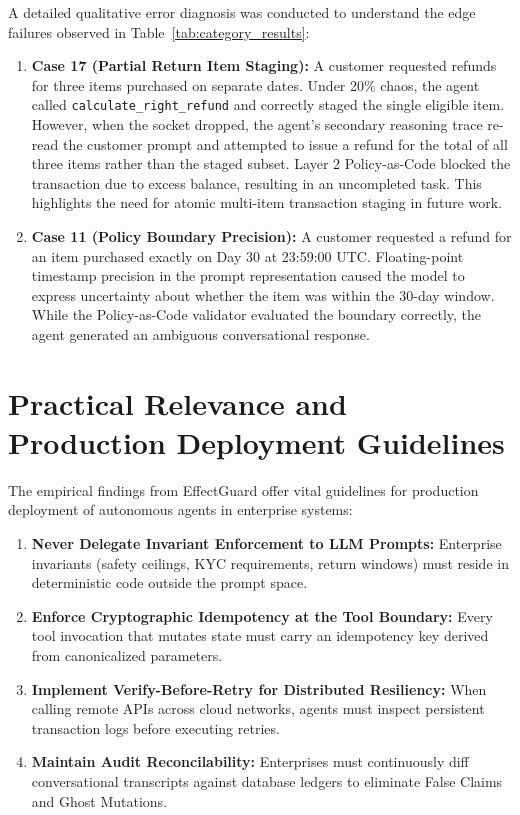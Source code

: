 A detailed qualitative error diagnosis was conducted to understand the edge failures observed in Table~\ref{tab:category_results}:

\begin{enumerate}
    \item \textbf{Case 17 (Partial Return Item Staging):}
    A customer requested refunds for three items purchased on separate dates. Under 20\% chaos, the agent called \texttt{calculate\_right\_refund} and correctly staged the single eligible item. However, when the socket dropped, the agent's secondary reasoning trace re-read the customer prompt and attempted to issue a refund for the total of all three items rather than the staged subset. Layer 2 Policy-as-Code blocked the transaction due to excess balance, resulting in an uncompleted task. This highlights the need for atomic multi-item transaction staging in future work.

    \item \textbf{Case 11 (Policy Boundary Precision):}
    A customer requested a refund for an item purchased exactly on Day 30 at 23:59:00 UTC. Floating-point timestamp precision in the prompt representation caused the model to express uncertainty about whether the item was within the 30-day window. While the Policy-as-Code validator evaluated the boundary correctly, the agent generated an ambiguous conversational response.
\end{enumerate}

\section{Practical Relevance and Production Deployment Guidelines}

The empirical findings from EffectGuard offer vital guidelines for production deployment of autonomous agents in enterprise systems:

\begin{enumerate}
    \item \textbf{Never Delegate Invariant Enforcement to LLM Prompts:} Enterprise invariants (safety ceilings, KYC requirements, return windows) must reside in deterministic code outside the prompt space.
    \item \textbf{Enforce Cryptographic Idempotency at the Tool Boundary:} Every tool invocation that mutates state must carry an idempotency key derived from canonicalized parameters.
    \item \textbf{Implement Verify-Before-Retry for Distributed Resiliency:} When calling remote APIs across cloud networks, agents must inspect persistent transaction logs before executing retries.
    \item \textbf{Maintain Audit Reconcilability:} Enterprises must continuously diff conversational transcripts against database ledgers to eliminate False Claims and Ghost Mutations.
\end{enumerate}

